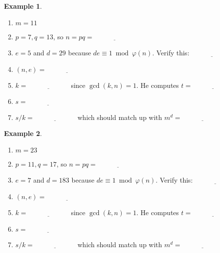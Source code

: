 \documentclass[12pt]{amsart}
\theoremstyle{plain}
\theoremstyle{definition}
\newtheorem*{ex}{Example}
\theoremstyle{remark}
\begin{document}
\begin{ex}
\begin{enumerate}[1.]
	\item[] $m = 11$
	\item $p = 7, q = 13$, so $n = pq = \underline{\hspace{1in}}$
	\item $e = 5$ and $d = 29$ because $de \equiv 1 \bmod \varphi(n)$.  Verify this:  $\underline{\hspace{1in}}$
	\item $(n,e) = \underline{\hspace{1in}}$
	\item $k = \underline{\hspace{1in}}$ since $\gcd(k,n) = 1$.  He computes $t = \underline{\hspace{1in}}$
	\item $s = \underline{\hspace{1in}}$
	\item $s/k = \underline{\hspace{1in}}$ which should match up with $m^d = \underline{\hspace{1in}}$
\end{enumerate}
\end{ex}

\newpage \begin{ex}
\begin{enumerate}[1.]
	\item[] $m = 23$
	\item $p = 11, q = 17$, so $n = pq = \underline{\hspace{1in}}$
	\item $e = 7$ and $d = 183$ because $de \equiv 1 \bmod \varphi(n)$.  Verify this:  $\underline{\hspace{1in}}$
	\item $(n,e) = \underline{\hspace{1in}}$
	\item $k = \underline{\hspace{1in}}$ since $\gcd(k,n) = 1$.  He computes $t = \underline{\hspace{1in}}$
	\item $s = \underline{\hspace{1in}}$
	\item $s/k = \underline{\hspace{1in}}$ which should match up with $m^d = \underline{\hspace{1in}}$
\end{enumerate}
\end{ex}
\end{document}

